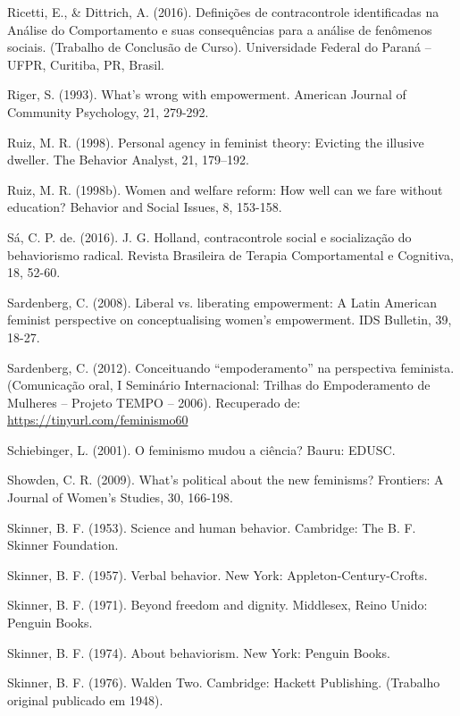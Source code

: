 \hangindent=25pt
\noindent Ricetti, E., \& Dittrich, A. (2016). Definições de contracontrole identificadas na Análise do Comportamento e suas consequências para a análise de fenômenos sociais. (Trabalho de Conclusão de Curso). Universidade Federal do Paraná – UFPR, Curitiba, PR, Brasil.

\hangindent=25pt
\noindent Riger, S. (1993). What’s wrong with empowerment. American Journal of Community Psychology, 21, 279-292.

\hangindent=25pt
\noindent Ruiz, M. R. (1998). Personal agency in feminist theory: Evicting the illusive dweller. The Behavior Analyst, 21, 179–192.

\hangindent=25pt
\noindent Ruiz, M. R. (1998b). Women and welfare reform: How well can we fare without education? Behavior and Social Issues, 8, 153-158.

\hangindent=25pt
\noindent Sá, C. P. de. (2016). J. G. Holland, contracontrole social e socialização do behaviorismo radical. Revista Brasileira de Terapia Comportamental e Cognitiva, 18, 52-60.

\hangindent=25pt
\noindent Sardenberg, C. (2008). Liberal vs. liberating empowerment: A Latin American 	feminist perspective on conceptualising women's empowerment. IDS Bulletin, 39, 18-27.

\hangindent=25pt
\noindent Sardenberg, C. (2012). Conceituando ``empoderamento'' na perspectiva feminista. (Comunicação oral, I Seminário Internacional: Trilhas do Empoderamento de Mulheres – Projeto TEMPO – 2006). Recuperado de: \url{https://tinyurl.com/feminismo60}

\hangindent=25pt
\noindent Schiebinger, L. (2001). O feminismo mudou a ciência? Bauru: EDUSC.

\hangindent=25pt
\noindent Showden, C. R. (2009). What’s political about the new feminisms? Frontiers: A Journal of Women’s Studies, 30, 166-198.

\hangindent=25pt
\noindent Skinner, B. F. (1953). Science and human behavior. Cambridge: The B. F. Skinner Foundation.

\hangindent=25pt
\noindent Skinner, B. F. (1957). Verbal behavior. New York: Appleton-Century-Crofts.

\hangindent=25pt
\noindent Skinner, B. F. (1971). Beyond freedom and dignity. Middlesex, Reino Unido: Penguin Books. 

\hangindent=25pt
\noindent Skinner, B. F. (1974). About behaviorism. New York: Penguin Books.

\hangindent=25pt
\noindent Skinner, B. F. (1976). Walden Two. Cambridge: Hackett Publishing. (Trabalho original publicado em 1948).
